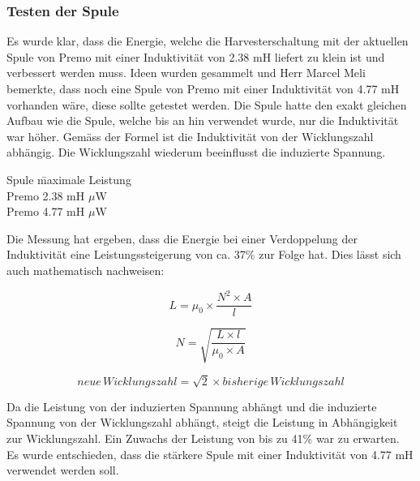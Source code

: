 \subsubsection{Testen der Spule}

Es wurde klar, dass die Energie, welche die Harvesterschaltung mit der aktuellen Spule von Premo mit einer Induktivität von 2.38 mH liefert zu klein ist und verbessert werden muss. Ideen wurden gesammelt und Herr Marcel Meli bemerkte, dass noch eine Spule von Premo mit einer Induktivität von 4.77 mH vorhanden wäre, diese sollte getestet werden. Die Spule hatte den exakt gleichen Aufbau wie die Spule, welche bis an hin verwendet wurde, nur die Induktivität war höher. Gemäss der Formel \cite{equ_inductivity} ist die Induktivität von der Wicklungszahl abhängig. Die Wicklungszahl wiederum beeinflusst die induzierte Spannung.

\begin{tabbing}
    Spule\hspace{2cm}   \quad\= maximale Leistung    \\[0.8ex]
    Premo 2.38 mH         $\mu$W\\
	Premo 4.77 mH         $\mu$W\\
	
\end{tabbing}

Die Messung hat ergeben, dass die Energie bei einer Verdoppelung der Induktivität eine Leistungssteigerung von ca. 37\thinspace\% zur Folge hat. Dies lässt sich auch mathematisch nachweisen:

\begin{equation}
	L = \mu_0 \times \frac{N^2\times A}{l}
\end{equation}

\begin{equation}
	N = \sqrt{\frac{L\times l}{\mu_0\times A}}
\end{equation}

\begin{equation}
	neue\,Wicklungszahl = \sqrt{2} \times bisherige\,Wicklungszahl
\end{equation}

Da die Leistung von der induzierten Spannung abhängt und die induzierte Spannung von der Wicklungszahl abhängt, steigt die Leistung in Abhängigkeit zur Wicklungszahl. Ein Zuwachs der Leistung von bis zu 41\thinspace\% war zu erwarten. Es wurde entschieden, dass die stärkere Spule mit einer Induktivität von 4.77 mH verwendet werden soll.

